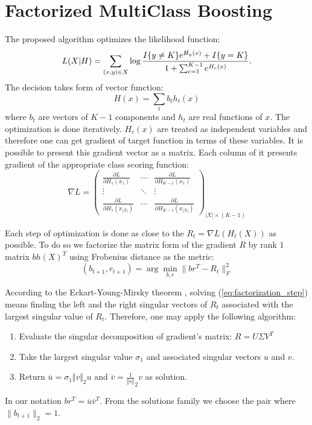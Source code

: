 \documentclass{article}
\begin{document}
\section{Factorized MultiClass Boosting}

The proposed algorithm optimizes the likelihood function:
\begin{multline*}
	L(X\arrowvert H) = \sum_{(x,y) \in X} \log \frac{ I\{y \ne K \}e^{H_y(x)} + I\{y=K\} }{ 1+\sum_{c=1}^{K-1} e^{H_c(x)} }.
\end{multline*}
The decision takes form of vector function:
\begin{equation}
H(x) = \sum_t b_{t} h_t(x) 
\end{equation}
where $b_t$ are vectors of $K-1$ components and $h_t$ are real functions of $x$. The optimization is done iteratively. $H_c(x)$ are treated as independent variables and therefore one can get gradient of target function in terms of these variables. It is possible to present this gradient vector as a matrix. Each column of it presents gradient of the appropriate class scoring function:
\begin{equation}
\label{eq:grad_matrix}
\nabla L = 
\left(
\begin{array}{ccc}
	  \frac{ \partial L }{ \partial H_{1}(x_{1}) } 
	& \cdots 
	& \frac{ \partial L }{ \partial H_{K-1}(x_{1}) } \\

	  \vdots & \ddots & \vdots\\

	  \frac{ \partial L }{ \partial H_{1}(x_{|X|}) } 
	& \cdots 
	& \frac{ \partial L }{ \partial H_{K-1}(x_{|X|}) }
\end{array}
\right)_{|X| \times (K-1)}
\end{equation}

Each step of optimization is done as close to the $R_t = \nabla L(H_t(X))$ as possible. To do so we factorize the matrix form of the gradient $R$ by rank $1$ matrix $b h(X)^T$ using Frobenius distance as the metric:
\begin{equation}
(b_{t+1},r_{t+1}) = \arg \min_{b,r} \|b r^T - R_t\|_F^2
\label{eq:factorization_step}
\end{equation}

According to the Eckart-Young-Mirsky theorem \cite{Eckart1936}, solving (\ref{eq:factorization_step}) means finding the left and the right singular vectors of $R_t$ associated with the largest singular value of $R_t$. Therefore, one may apply the following algorithm: 
\begin{enumerate}
	\item Evaluate the singular decomposition of gradient's matrix: $R = U \Sigma V^T$
	\item Take the largest singular value $\sigma_{1}$ and associated singular vectors $u$ and $v$.
	\item Return $\overline{u}={\sigma_{1}}{\Vert v \Vert}_{2}u$ and $\overline{v}=\frac{1}{\Vert v \Vert}_{2}v$ as solution.
\end{enumerate}
In our notation $br^T = \overline{u}\overline{v}^T$. From the solutions family we choose the pair where $\|b_{t+1}\|_2 = 1$.
\end{document}

